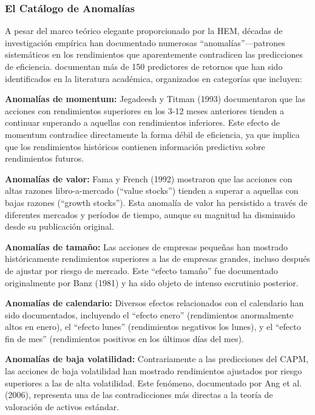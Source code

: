 \documentclass[11pt,a4paper]{article}
\begin{document}
\subsubsection{El Catálogo de Anomalías}

A pesar del marco teórico elegante proporcionado por la HEM, décadas de investigación empírica han documentado numerosas ``anomalías''---patrones sistemáticos en los rendimientos que aparentemente contradicen las predicciones de eficiencia. \citet{dong2022} documentan más de 150 predictores de retornos que han sido identificados en la literatura académica, organizados en categorías que incluyen:

\textbf{Anomalías de momentum:} Jegadeesh y Titman (1993) documentaron que las acciones con rendimientos superiores en los 3-12 meses anteriores tienden a continuar superando a aquellas con rendimientos inferiores. Este efecto de momentum contradice directamente la forma débil de eficiencia, ya que implica que los rendimientos históricos contienen información predictiva sobre rendimientos futuros.

\textbf{Anomalías de valor:} Fama y French (1992) mostraron que las acciones con altas razones libro-a-mercado (``value stocks'') tienden a superar a aquellas con bajas razones (``growth stocks''). Esta anomalía de valor ha persistido a través de diferentes mercados y períodos de tiempo, aunque su magnitud ha disminuido desde su publicación original.

\textbf{Anomalías de tamaño:} Las acciones de empresas pequeñas han mostrado históricamente rendimientos superiores a las de empresas grandes, incluso después de ajustar por riesgo de mercado. Este ``efecto tamaño'' fue documentado originalmente por Banz (1981) y ha sido objeto de intenso escrutinio posterior.

\textbf{Anomalías de calendario:} Diversos efectos relacionados con el calendario han sido documentados, incluyendo el ``efecto enero'' (rendimientos anormalmente altos en enero), el ``efecto lunes'' (rendimientos negativos los lunes), y el ``efecto fin de mes'' (rendimientos positivos en los últimos días del mes).

\textbf{Anomalías de baja volatilidad:} Contrariamente a las predicciones del CAPM, las acciones de baja volatilidad han mostrado rendimientos ajustados por riesgo superiores a las de alta volatilidad. Este fenómeno, documentado por Ang et al. (2006), representa una de las contradicciones más directas a la teoría de valoración de activos estándar.
\end{document}
